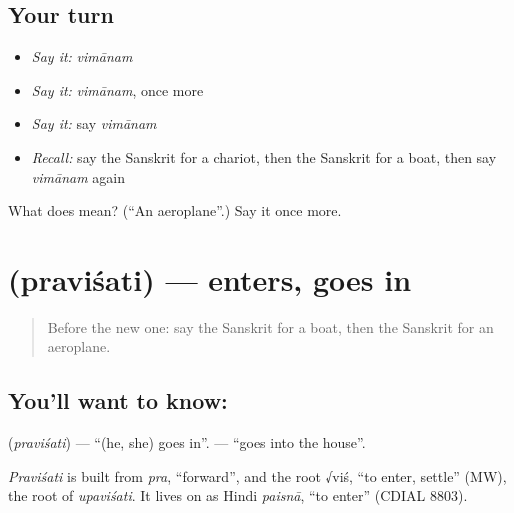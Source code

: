 \subsection*{Your turn}
\begin{itemize}
\raggedright
  \item \emph{Say it:} \emph{vimānam}
  \item \emph{Say it:} \emph{vimānam}, once more
  \item \emph{Say it:} say \emph{vimānam}
  \item \emph{Recall:} say the Sanskrit for a chariot, then the Sanskrit for a boat, then say \emph{vimānam} again
\end{itemize}

\begin{tcolorbox}[breakable,colback=teal!4,colframe=teal!35!black,title={Before you move on}]
What does  mean? (\textquotedblleft{}An aeroplane\textquotedblright{}.) Say it once more.
\end{tcolorbox}
\section[\texorpdfstring{\sk{प्रविशति} (praviśati)}{प्रविशति (praviśati)}]{ (praviśati) — enters, goes in}

\label{lesson:SA-C75-enters}



\begin{quote}
Before the new one: say the Sanskrit for a boat, then the Sanskrit for an aeroplane.
\end{quote}

\subsection*{You'll want to know: }
\textbf{} (\emph{praviśati}) — \textquotedblleft{}(he, she) goes in\textquotedblright{}. \textbf{ } — \textquotedblleft{}goes into the house\textquotedblright{}.

\begin{cousinweb}
\emph{Praviśati} is built from \emph{pra}, \textquotedblleft{}forward\textquotedblright{}, and the root √viś, \textquotedblleft{}to enter, settle\textquotedblright{} (MW), the root of \emph{upaviśati}. It lives on as Hindi \emph{paisnā}, \textquotedblleft{}to enter\textquotedblright{} (CDIAL 8803).
\end{cousinweb}

